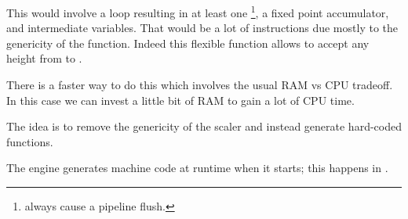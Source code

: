 \par
\begin{minipage}{\textwidth}

\end{minipage}

\par
This would involve a loop resulting in at least one \footnote{ always cause a pipeline flush.}, a fixed point accumulator, and intermediate variables. That would be a lot of instructions due mostly to the genericity of the function. Indeed this flexible function allows  to accept any height from  to .\\
\par
 There is a faster way to do this which involves the usual RAM vs CPU tradeoff. In this case we can invest a little bit of RAM to gain a lot of CPU time.\\
 \par 
 The idea is to remove the genericity of the scaler and instead generate hard-coded functions.\\
\par
\begin{minipage}{\textwidth}

\end{minipage}

 The engine generates machine code at runtime when it starts; this happens in .\\
 
